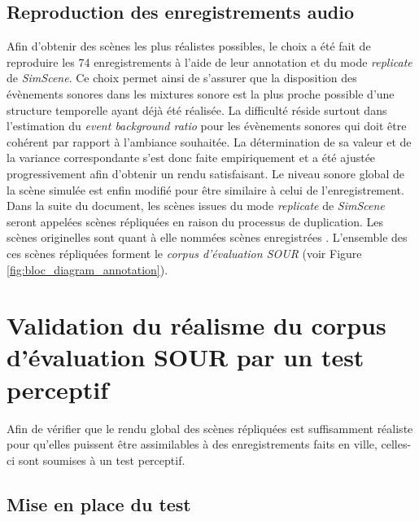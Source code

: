 \subsection{Reproduction des enregistrements audio}

Afin d'obtenir des scènes les plus réalistes possibles, le choix a été fait de reproduire les 74 enregistrements à l'aide de leur annotation et du mode \textit{replicate} de \textit{SimScene}. Ce choix permet ainsi de s'assurer que la disposition des évènements sonores dans les mixtures sonore est la plus proche possible d'une structure temporelle ayant déjà été réalisée. La difficulté réside surtout dans l'estimation du \textit{event background ratio} pour les évènements sonores qui doit être cohérent par rapport à l'ambiance souhaitée. La détermination de sa valeur et de la variance correspondante s'est donc faite empiriquement et a été ajustée progressivement afin d'obtenir un rendu satisfaisant. Le niveau sonore global de la scène simulée est enfin modifié pour être similaire à celui de l'enregistrement.\\

Dans la suite du document, les scènes issues du mode \textit{replicate} de \textit{SimScene} seront appelées \og scènes répliquées \fg{} en raison du processus de duplication. Les scènes originelles sont quant à elle nommées \og scènes enregistrées \fg{}. L'ensemble des ces scènes répliquées forment le \textit{corpus d'évaluation SOUR} (voir Figure \ref{fig:bloc_diagram_annotation}).\\


\section{Validation du réalisme du corpus d'évaluation SOUR par un test perceptif}\label{sec:test}

Afin de vérifier que le rendu global des scènes répliquées est suffisamment réaliste pour qu'elles puissent être assimilables à des enregistrements faits en ville, celles-ci sont soumises à un test perceptif.

\subsection{Mise en place du test}

